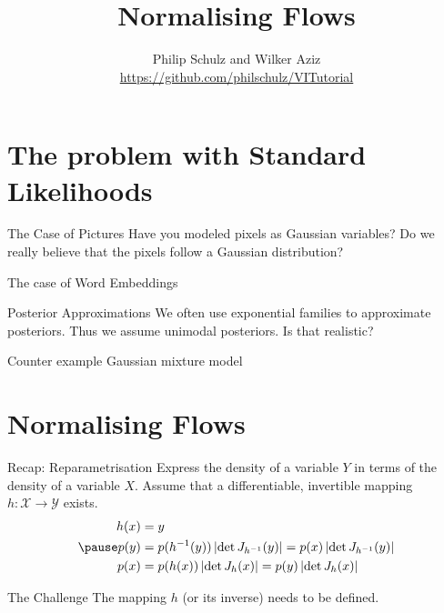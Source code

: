 \documentclass[14pt]{beamer}
\title{Normalising Flows}
\author{Philip Schulz and Wilker Aziz\\
\url{https://github.com/philschulz/VITutorial}}
\date{}
\begin{document}
\begin{frame}
\maketitle
\end{frame}

\begin{frame}
\tableofcontents
\end{frame}

\section{The problem with Standard Likelihoods}

\begin{frame}
\tableofcontents[current]
\end{frame}

\begin{frame}{The Case of Pictures}
Have you modeled pixels as Gaussian variables?
Do we really believe that the pixels follow a Gaussian distribution?
\end{frame}

\begin{frame}{The case of Word Embeddings}
\end{frame}

\begin{frame}{Posterior Approximations}
We often use exponential families to approximate posteriors. Thus we assume unimodal posteriors. Is that realistic?
\begin{block}{Counter example}
Gaussian mixture model
\end{block}
\end{frame}

\section{Normalising Flows}

\begin{frame}
\tableofcontents[current]
\end{frame}

\begin{frame}{Recap: Reparametrisation}
Express the density of a variable $ Y $ in terms of the density of a variable $ X $. Assume that a differentiable, invertible mapping
$ h: \mathcal{X} \rightarrow \mathcal{Y} $ exists.
\begin{equation*}
\begin{aligned}
h(x) &= y \\ \pause
p(y) &= p(h^{-1}(y))\abs{\det J_{h^{-1}}(y)} = p(x)\abs{\det J_{h^{-1}}(y)}  \\
p(x) &= p(h(x))\abs{\det J_{h}(x)} = p(y)\abs{\det J_{h}(x)}
\end{aligned}
\end{equation*}
\begin{block}{The Challenge}
The mapping $ h $ (or its inverse) needs to be defined.
\end{block}
\end{frame}
\end{document}

